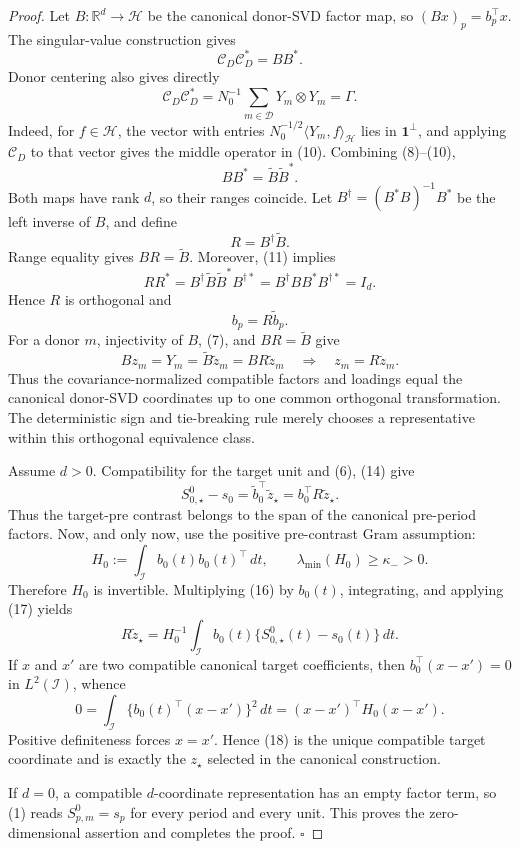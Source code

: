 \documentclass{article}
\begin{document}
\begin{proof}
Let \(B:\mathbb R^d\to\mathcal H\) be the canonical donor-SVD factor map,
so \((Bx)_p=b_p^\top x\).  The singular-value construction gives
\[
 \mathcal C_D\mathcal C_D^*=BB^*.                        \tag{9}
\]
Donor centering also gives directly
\[
 \mathcal C_D\mathcal C_D^*
 =N_0^{-1}\sum_{m\in\mathcal D}Y_m\otimes Y_m=\Gamma.   \tag{10}
\]
Indeed, for \(f\in\mathcal H\), the vector with entries
\(N_0^{-1/2}\langle Y_m,f\rangle_{\mathcal H}\) lies in
\(\mathbf 1^\perp\), and applying \(\mathcal C_D\) to that vector gives the
middle operator in (10).  Combining (8)--(10),
\[
 BB^*=\widetilde B\widetilde B^*.                        \tag{11}
\]
Both maps have rank \(d\), so their ranges coincide.  Let
\(B^\dagger=(B^*B)^{-1}B^*\) be the left inverse of \(B\), and define
\[
 R=B^\dagger\widetilde B.                                \tag{12}
\]
Range equality gives \(BR=\widetilde B\).  Moreover, (11) implies
\[
 RR^*=B^\dagger\widetilde B\widetilde B^*B^{\dagger *}
     =B^\dagger BB^*B^{\dagger *}=I_d.                  \tag{13}
\]
Hence \(R\) is orthogonal and
\[
 b_p=R\widetilde b_p.                                    \tag{14}
\]
For a donor \(m\), injectivity of \(B\), (7), and
\(BR=\widetilde B\) give
\[
 Bz_m=Y_m=\widetilde B\widetilde z_m=BR\widetilde z_m
 \quad\Longrightarrow\quad z_m=R\widetilde z_m.        \tag{15}
\]
Thus the covariance-normalized compatible factors and loadings equal the
canonical donor-SVD coordinates up to one common orthogonal transformation.
The deterministic sign and tie-breaking rule merely chooses a representative
within this orthogonal equivalence class.

Assume \(d>0\).  Compatibility for the target unit and (6), (14) give
\[
 S^0_{0,\star}-s_0
 =\widetilde b_0^\top\widetilde z_\star
 =b_0^\top R\widetilde z_\star.                          \tag{16}
\]
Thus the target-pre contrast belongs to the span of the canonical pre-period
factors.  Now, and only now, use the positive pre-contrast Gram assumption:
\[
 H_0:=\int_{\mathcal I}b_0(t)b_0(t)^\top\,dt,
 \qquad \lambda_{\min}(H_0)\geq\kappa_->0.              \tag{17}
\]
Therefore \(H_0\) is invertible.  Multiplying (16) by \(b_0(t)\),
integrating, and applying (17) yields
\[
 R\widetilde z_\star
 =H_0^{-1}\int_{\mathcal I}b_0(t)
 \{S^0_{0,\star}(t)-s_0(t)\}\,dt.                       \tag{18}
\]
If \(x\) and \(x'\) are two compatible canonical target coefficients, then
\(b_0^\top(x-x')=0\) in \(L^2(\mathcal I)\), whence
\[
 0=\int_{\mathcal I}\{b_0(t)^\top(x-x')\}^2\,dt
  =(x-x')^\top H_0(x-x').                                \tag{19}
\]
Positive definiteness forces \(x=x'\).  Hence (18) is the unique compatible
target coordinate and is exactly the \(z_\star\) selected in the canonical
construction.

If \(d=0\), a compatible \(d\)-coordinate representation has an empty factor
term, so (1) reads \(S^0_{p,m}=s_p\) for every period and every unit.  This
proves the zero-dimensional assertion and completes the proof. \(\square\)
\end{proof}
\end{document}
